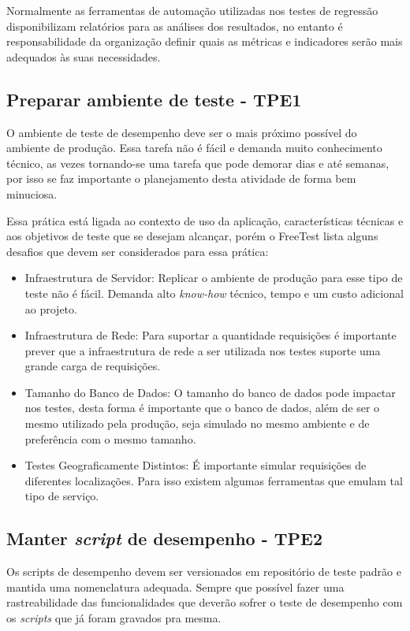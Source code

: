 Normalmente as ferramentas de automação utilizadas nos testes de regressão disponibilizam relatórios para as análises dos resultados, no entanto é responsabilidade da organização definir quais as métricas e indicadores serão mais adequados às suas necessidades.

\subsection{Preparar ambiente de teste - TPE1}

O ambiente de teste de desempenho deve ser o mais próximo possível do ambiente de produção. Essa tarefa não é fácil e demanda muito conhecimento técnico, as vezes tornando-se uma tarefa que pode demorar dias e até semanas, por isso se faz importante o planejamento desta atividade de forma bem minuciosa.

Essa prática está ligada ao contexto de uso da aplicação, características técnicas e aos objetivos de teste que se desejam alcançar, porém o FreeTest lista alguns desafios que devem ser considerados para essa prática:

\begin{itemize}
	\item Infraestrutura de Servidor: Replicar o ambiente de produção para esse tipo de teste não é fácil. Demanda alto \textit{know-how} técnico, tempo e um custo adicional ao projeto.
	\item Infraestrutura de Rede: Para suportar a quantidade requisições é importante prever que a infraestrutura de rede a ser utilizada nos testes suporte uma grande carga de requisições.
	\item Tamanho do Banco de Dados: O tamanho do banco de dados pode impactar nos testes, desta forma é importante que o banco de dados, além de ser o mesmo utilizado pela produção, seja simulado no mesmo ambiente e de preferência com o mesmo tamanho.
	\item Testes Geograficamente Distintos: É importante simular requisições de diferentes localizações. Para isso existem algumas ferramentas que emulam tal tipo de serviço.
\end{itemize}


\subsection{Manter \textit{script} de desempenho - TPE2}

Os scripts de desempenho devem ser versionados em repositório de teste padrão e mantida uma nomenclatura adequada. Sempre que possível fazer uma rastreabilidade das funcionalidades que deverão sofrer o teste de desempenho com os \textit{scripts} que já foram gravados pra mesma.

